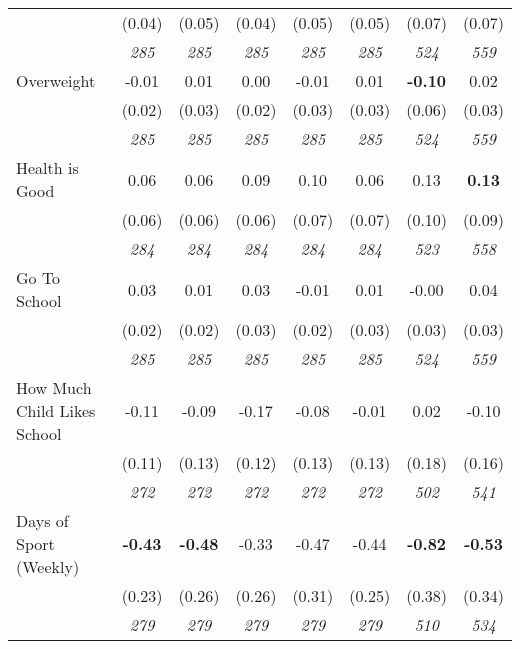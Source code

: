 \begin{tabular}{l c c c c c c c}
& (0.04) & (0.05) & (0.04) & (0.05) & (0.05) & (0.07) & (0.07) \\
& \textit{ 285 } & \textit{ 285 } & \textit{ 285 } & \textit{ 285 } & \textit{ 285 } & \textit{ 524 } & \textit{ 559 } \\
Overweight & -0.01 & 0.01 & 0.00 & -0.01 & 0.01 & \textbf{ -0.10 } & 0.02 \\
& (0.02) & (0.03) & (0.02) & (0.03) & (0.03) & (0.06) & (0.03) \\
& \textit{ 285 } & \textit{ 285 } & \textit{ 285 } & \textit{ 285 } & \textit{ 285 } & \textit{ 524 } & \textit{ 559 } \\
Health is Good & 0.06 & 0.06 & 0.09 & 0.10 & 0.06 & 0.13 & \textbf{ 0.13 } \\
& (0.06) & (0.06) & (0.06) & (0.07) & (0.07) & (0.10) & (0.09) \\
& \textit{ 284 } & \textit{ 284 } & \textit{ 284 } & \textit{ 284 } & \textit{ 284 } & \textit{ 523 } & \textit{ 558 } \\
Go To School & 0.03 & 0.01 & 0.03 & -0.01 & 0.01 & -0.00 & 0.04 \\
& (0.02) & (0.02) & (0.03) & (0.02) & (0.03) & (0.03) & (0.03) \\
& \textit{ 285 } & \textit{ 285 } & \textit{ 285 } & \textit{ 285 } & \textit{ 285 } & \textit{ 524 } & \textit{ 559 } \\
How Much Child Likes School & -0.11 & -0.09 & -0.17 & -0.08 & -0.01 & 0.02 & -0.10 \\
& (0.11) & (0.13) & (0.12) & (0.13) & (0.13) & (0.18) & (0.16) \\
& \textit{ 272 } & \textit{ 272 } & \textit{ 272 } & \textit{ 272 } & \textit{ 272 } & \textit{ 502 } & \textit{ 541 } \\
Days of Sport (Weekly) & \textbf{ -0.43 } & \textbf{ -0.48 } & -0.33 & -0.47 & -0.44 & \textbf{ -0.82 } & \textbf{ -0.53 } \\
& (0.23) & (0.26) & (0.26) & (0.31) & (0.25) & (0.38) & (0.34) \\
& \textit{ 279 } & \textit{ 279 } & \textit{ 279 } & \textit{ 279 } & \textit{ 279 } & \textit{ 510 } & \textit{ 534 } \\
\bottomrule
\end{tabular}
